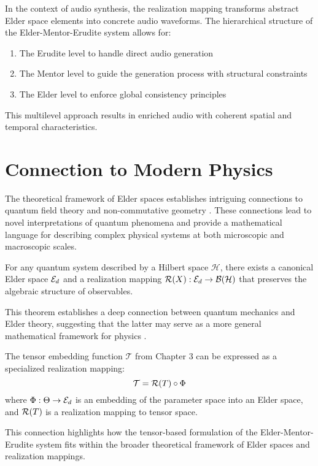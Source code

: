 \begin{example}
In the context of audio synthesis, the realization mapping transforms abstract Elder space elements into concrete audio waveforms. The hierarchical structure of the Elder-Mentor-Erudite system allows for:
\begin{enumerate}
    \item The Erudite level to handle direct audio generation
    \item The Mentor level to guide the generation process with structural constraints
    \item The Elder level to enforce global consistency principles
\end{enumerate}
This multilevel approach results in enriched audio with coherent spatial and temporal characteristics.
\end{example}

\section{Connection to Modern Physics}

The theoretical framework of Elder spaces establishes intriguing connections to quantum field theory and non-commutative geometry \cite{heliomorphic_math}. These connections lead to novel interpretations of quantum phenomena and provide a mathematical language for describing complex physical systems at both microscopic and macroscopic scales.

\begin{theorem}
For any quantum system described by a Hilbert space $\mathcal{H}$, there exists a canonical Elder space $\mathcal{E}_{d}$ and a realization mapping $\mathcal{R}(X): \mathcal{E}_{d} \rightarrow \mathcal{B}(\mathcal{H})$ that preserves the algebraic structure of observables.
\end{theorem}

This theorem establishes a deep connection between quantum mechanics and Elder theory, suggesting that the latter may serve as a more general mathematical framework for physics \cite{orbital_mechanics_learning}.

\begin{proposition}
The tensor embedding function $\mathcal{T}$ from Chapter 3 can be expressed as a specialized realization mapping:
\begin{equation}
\mathcal{T} = \mathcal{R}(T) \circ \Phi
\end{equation}
where $\Phi: \Theta \rightarrow \mathcal{E}_{d}$ is an embedding of the parameter space into an Elder space, and $\mathcal{R}(T)$ is a realization mapping to tensor space.
\end{proposition}

This connection highlights how the tensor-based formulation of the Elder-Mentor-Erudite system fits within the broader theoretical framework of Elder spaces and realization mappings.